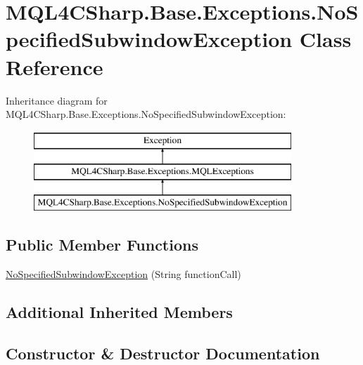 \hypertarget{class_m_q_l4_c_sharp_1_1_base_1_1_exceptions_1_1_no_specified_subwindow_exception}{}\section{M\+Q\+L4\+C\+Sharp.\+Base.\+Exceptions.\+No\+Specified\+Subwindow\+Exception Class Reference}
\label{class_m_q_l4_c_sharp_1_1_base_1_1_exceptions_1_1_no_specified_subwindow_exception}
Inheritance diagram for M\+Q\+L4\+C\+Sharp.\+Base.\+Exceptions.\+No\+Specified\+Subwindow\+Exception\+:\begin{figure}[H]
\begin{center}
\leavevmode
\includegraphics[height=3.000000cm]{class_m_q_l4_c_sharp_1_1_base_1_1_exceptions_1_1_no_specified_subwindow_exception}
\end{center}
\end{figure}
\subsection*{Public Member Functions}
\begin{DoxyCompactItemize}
\item 
\hyperlink{class_m_q_l4_c_sharp_1_1_base_1_1_exceptions_1_1_no_specified_subwindow_exception_a96ce023a753aa1fa4a99561bd1080974}{No\+Specified\+Subwindow\+Exception} (String function\+Call)
\end{DoxyCompactItemize}
\subsection*{Additional Inherited Members}


\subsection{Constructor \& Destructor Documentation}

